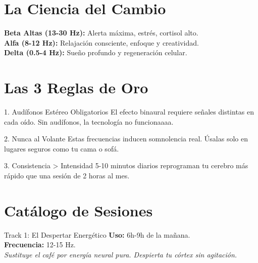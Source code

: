 \documentclass[11pt,oneside]{article}
\begin{document}
\section{La Ciencia del Cambio}
\begin{center}
\begin{neurocard}[width=16cm, title=Frecuencias de Dominio Mental]
    {\color{neoncyan}\faBolt} \textbf{Beta Altas (13-30 Hz):} Alerta máxima, estrés, cortisol alto. \\[0.3cm]
    {\color{neoncyan}\faBolt} \textbf{Alfa (8-12 Hz):} Relajación consciente, enfoque y creatividad. \\[0.3cm]
    {\color{neoncyan}\faBolt} \textbf{Delta (0.5-4 Hz):} Sueño profundo y regeneración celular.
\end{neurocard}
\end{center}

\section{Las 3 Reglas de Oro}
\begin{neurocard}[colframe=emerald]{1. Audífonos Estéreo Obligatorios}
    \faHeadphones \hspace{0.2cm} El efecto binaural requiere señales distintas en cada oído. Sin audífonos, la tecnología no funcionaaaa.
\end{neurocard}

\begin{neurocard}[colframe=neonpink]{2. Nunca al Volante}
    \faExclamationTriangle \hspace{0.2cm} Estas frecuencias inducen somnolencia real. Úsalas solo en lugares seguros como tu cama o sofá.
\end{neurocard}

\begin{neurocard}[colframe=neoncyan]{3. Consistencia > Intensidad}
    \faCalendarCheck \hspace{0.2cm} 5-10 minutos diarios reprograman tu cerebro más rápido que una sesión de 2 horas al mes.
\end{neurocard}

\newpage

\section{Catálogo de Sesiones}

\begin{neurocard}[colframe=amber]{Track 1: El Despertar Energético}
    \textbf{\faSun \hspace{0.1cm} Uso:} 6h-9h de la mañana. \\
    \textbf{Frecuencia:} 12-15 Hz. \\
    \textit{Sustituye el café por energía neural pura. Despierta tu córtex sin agitación.}
\end{neurocard}
\end{document}
